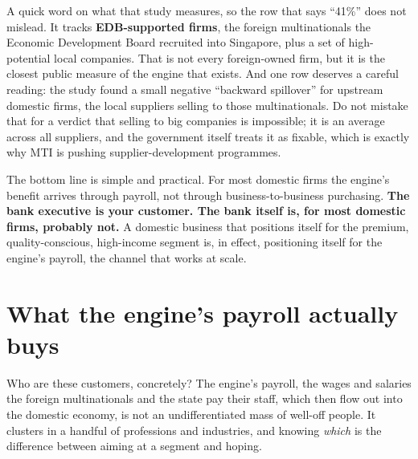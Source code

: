 \documentclass[10pt,twoside,openany]{memoir}
\newcommand{\needspacehead}{\needspace{4\baselineskip}}
\let\oldsection\section
\renewcommand{\section}{\needspacehead\oldsection}
\begin{document}
{{{{{{A quick word on what that study measures, so the row that says ``41\%''
does not mislead. It tracks \textbf{EDB-supported firms}, the foreign
multinationals the Economic Development Board recruited into Singapore,
plus a set of high-potential local companies. That is not every
foreign-owned firm, but it is the closest public measure of the engine
that exists. And one row deserves a careful reading: the study found a
small negative ``backward spillover'' for upstream domestic firms, the
local suppliers selling to those multinationals. Do not mistake that for
a verdict that selling to big companies is impossible; it is an average
across all suppliers, and the government itself treats it as fixable,
which is exactly why MTI is pushing supplier-development programmes.

The bottom line is simple and practical. For most domestic firms the
engine's benefit arrives through payroll, not through
business-to-business purchasing. \textbf{The bank executive is your
customer. The bank itself is, for most domestic firms, probably not.} A
domestic business that positions itself for the premium,
quality-conscious, high-income segment is, in effect, positioning itself
for the engine's payroll, the channel that works at scale.

\section{What the engine's payroll actually
buys}\label{what-the-engines-payroll-actually-buys}

Who are these customers, concretely? The engine's payroll, the wages and
salaries the foreign multinationals and the state pay their staff, which
then flow out into the domestic economy, is not an undifferentiated mass
of well-off people. It clusters in a handful of professions and
industries, and knowing \emph{which} is the difference between aiming at
a segment and hoping.

}}}}}}
\end{document}
